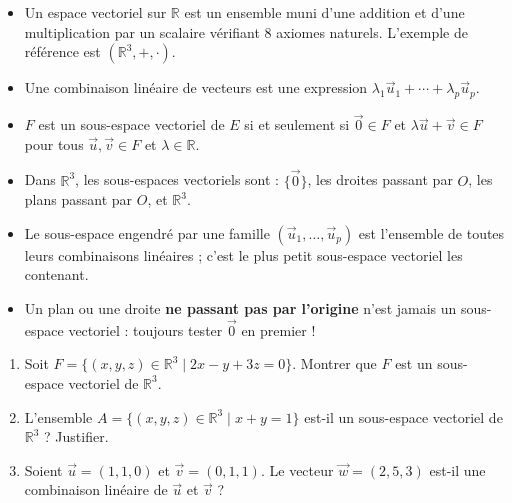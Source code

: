 \documentclass[11pt]{article}
\newcommand{\cle}[1]{{\popxbold\color{popdark}#1}}
\begin{document}
\begin{aretenir}
\begin{itemize}
\item Un \cle{espace vectoriel} sur $\mathbb{R}$ est un ensemble muni d'une addition et d'une multiplication par un scalaire vérifiant 8 axiomes naturels. L'exemple de référence est $(\mathbb{R}^3, +, \cdot)$.
\item Une \cle{combinaison linéaire} de vecteurs est une expression $\lambda_1\vec{u}_1 + \cdots + \lambda_p\vec{u}_p$.
\item $F$ est un \cle{sous-espace vectoriel} de $E$ si et seulement si $\vec{0} \in F$ et $\lambda\vec{u} + \vec{v} \in F$ pour tous $\vec{u}, \vec{v} \in F$ et $\lambda \in \mathbb{R}$.
\item Dans $\mathbb{R}^3$, les sous-espaces vectoriels sont : $\{\vec{0}\}$, les droites passant par $O$, les plans passant par $O$, et $\mathbb{R}^3$.
\item Le \cle{sous-espace engendré} par une famille $(\vec{u}_1,\dots,\vec{u}_p)$ est l'ensemble de toutes leurs combinaisons linéaires ; c'est le plus petit sous-espace vectoriel les contenant.
\item Un plan ou une droite \textbf{ne passant pas par l'origine} n'est jamais un sous-espace vectoriel : toujours tester $\vec{0}$ en premier !
\end{itemize}
\end{aretenir}

\begin{exercice}[Entraînement]
\begin{enumerate}
\item Soit $F = \{(x,y,z) \in \mathbb{R}^3 \mid 2x - y + 3z = 0\}$. Montrer que $F$ est un sous-espace vectoriel de $\mathbb{R}^3$.
\item L'ensemble $A = \{(x,y,z) \in \mathbb{R}^3 \mid x + y = 1\}$ est-il un sous-espace vectoriel de $\mathbb{R}^3$ ? Justifier.
\item Soient $\vec{u} = (1,1,0)$ et $\vec{v} = (0,1,1)$. Le vecteur $\vec{w} = (2,5,3)$ est-il une combinaison linéaire de $\vec{u}$ et $\vec{v}$ ?
\end{enumerate}
\end{exercice}
\end{document}
